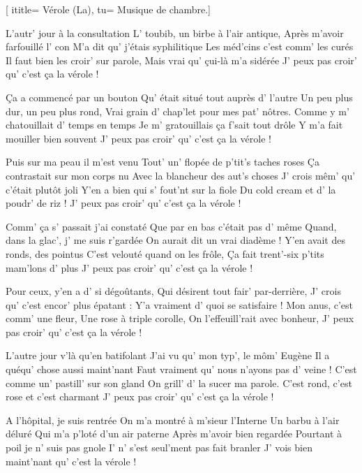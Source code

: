  [
ititle= {Vérole (La)},
tu= {Musique de chambre.}]

\beginverse
L'autr' jour à la consultation
L' toubib, un birbe à l'air antique,
Après m'avoir farfouillé l' con
M'a dit qu' j'étais syphilitique
Les méd'cins c'est comm' les curés
Il faut bien les croir' sur parole,
Mais vrai qu' çui-là m'a sidérée
J' peux pas croir' qu' c'est ça la vérole !
\endverse

\beginverse
Ça a commencé par un bouton
Qu' était situé tout auprès d' l'autre
Un peu plus dur, un peu plus rond,
Vrai grain d' chap'let pour mes pat' nôtres.
Comme y m' chatouillait d' temps en temps
Je m' gratouillais ça f'sait tout drôle
Y m'a fait mouiller bien souvent
J' peux pas croir' qu' c'est ça la vérole !
\endverse

\beginverse
Puis sur ma peau il m'est venu
Tout' un' flopée de p'tit's taches roses
Ça contrastait sur mon corps nu
Avec la blancheur des aut's choses
J' crois mêm' qu' c'était plutôt joli
Y'en a bien qui s' fout'nt sur la fiole
Du cold cream et d' la poudr' de riz !
J' peux pas croir' qu' c'est ça la vérole !
\endverse

\beginverse
Comm' ça s' passait j'ai constaté
Que par en bas c'était pas d' même
Quand, dans la glac', j' me suis r'gardée
On aurait dit un vrai diadème !
Y'en avait des ronds, des pointus
C'est velouté quand on les frôle,
Ça fait trent'-six p'tits mam'lons d' plus
J' peux pas croir' qu' c'est ça la vérole !
\endverse

\beginverse
Pour ceux, y'en a d' si dégoûtants,
Qui désirent tout fair' par-derrière,
J' crois qu' c'est encor' plus épatant :
Y'a vraiment d' quoi se satisfaire !
Mon anus, c'est comm' une fleur,
Une rose à triple corolle,
On l'effeuill'rait avec bonheur,
J' peux pas croir' qu' c'est ça la vérole !
\endverse

\beginverse
L'autre jour v'là qu'en batifolant
J'ai vu qu' mon typ', le môm' Eugène
Il a quéqu' chose aussi maint'nant
Faut vraiment qu' nous n'ayons pas d' veine !
C'est comme un' pastill' sur son gland
On grill' d' la sucer ma parole.
C'est rond, c'est rose et c'est charmant
J' peux pas croir' qu' c'est ça la vérole !
\endverse

\beginverse
A l'hôpital, je suis rentrée
On m'a montré à m'sieur l'Interne
Un barbu à l'air déluré
Qui m'a p'loté d'un air paterne
Après m'avoir bien regardée
Pourtant à poil je n' suis pas gnole
I' n' s'est seul'ment pas fait branler
J' vois bien maint'nant qu' c'est la vérole !
\endverse

\endsong